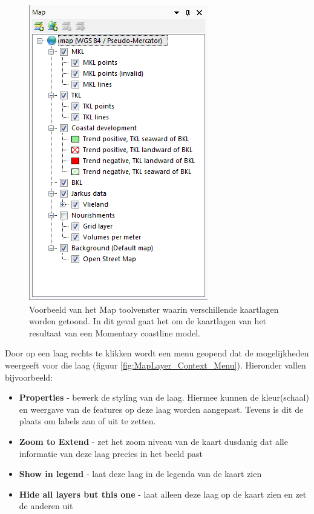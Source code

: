 \begin{figure}[h!]
	\centering
		\includegraphics{figures/chapter_general/Map_Contents.png}
		\caption{Voorbeeld van het Map toolvenster waarin verschillende kaartlagen worden getoond. In dit geval gaat het om de kaartlagen van het resultaat van een Momentary coastline model.}
	\label{fig:Map_Contents}
\end{figure}

Door op een laag rechts te klikken wordt een menu geopend dat de mogelijkheden weergeeft voor die laag (figuur \ref{fig:MapLayer_Context_Menu}). Hieronder vallen bijvoorbeeld:
\begin{itemize}
\item \textbf{Properties} - bewerk de styling van de laag. Hiermee kunnen de kleur(schaal) en weergave van de features op deze laag worden aangepast. Tevens is dit de plaats om labels aan of uit te zetten.
\item \textbf{Zoom to Extend} - zet het zoom niveau van de kaart dusdanig dat alle informatie van deze laag precies in het beeld past
\item \textbf{Show in legend} - laat deze laag in de legenda van de kaart zien
\item \textbf{Hide all layers but this one} - laat alleen deze laag op de kaart zien en zet de anderen uit
\end{itemize}

